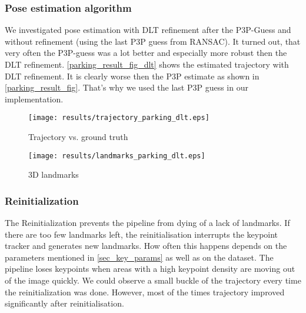\subsubsection{Pose estimation algorithm}
We investigated pose estimation with DLT refinement after the P3P-Guess and without refinement (using the last P3P guess from RANSAC). It turned out, that very often the P3P-guess was a lot better and especially more robust then the DLT refinement. \cref{parking_result_fig_dlt} shows the estimated trajectory with DLT refinement. It is clearly worse then the P3P estimate as shown in \cref{parking_result_fig}. That's why we used the last P3P guess in our implementation.
\begin{figure*}[ht!]
    \centering
    \begin{subfigure}[t]{0.5\textwidth}
        \centering
        \texttt{[image: results/trajectory\_parking\_dlt.eps]} 
        \caption{Trajectory vs. ground truth}
    \end{subfigure} 
    \begin{subfigure}[t]{0.5\textwidth}
        \centering
        \texttt{[image: results/landmarks\_parking\_dlt.eps]}
        \caption{3D landmarks}
    \end{subfigure}
    \caption{Parking dataset results with DLT refinement}
		\label{parking_result_fig_dlt}
\end{figure*}

\subsubsection{Reinitialization}
The Reinitialization prevents the pipeline from dying of a lack of landmarks. If there are too few landmarks left, the reinitialisation interrupts the keypoint tracker and generates new landmarks. How often this happens depends on the parameters mentioned in \cref{sec_key_params} as well as on the dataset. The pipeline loses keypoints when areas with a high keypoint density are moving out of the image quickly. We could observe a small buckle of the trajectory every time the reinitialization was done. However, most of the times trajectory improved significantly after reinitialisation.

